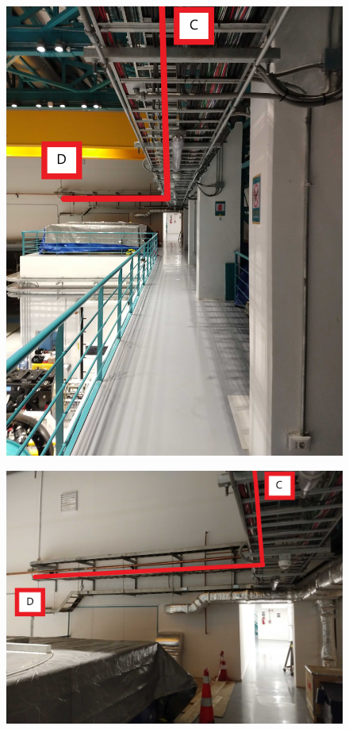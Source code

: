 \begin{figure}
  \includegraphics[width=\textwidth]{images/15.jpg}
  \label{fig:jlsimon}
\end{figure}

\begin{figure}
  \includegraphics[width=\textwidth]{images/16.jpg}
  \label{fig:jlsimon}
\end{figure}

